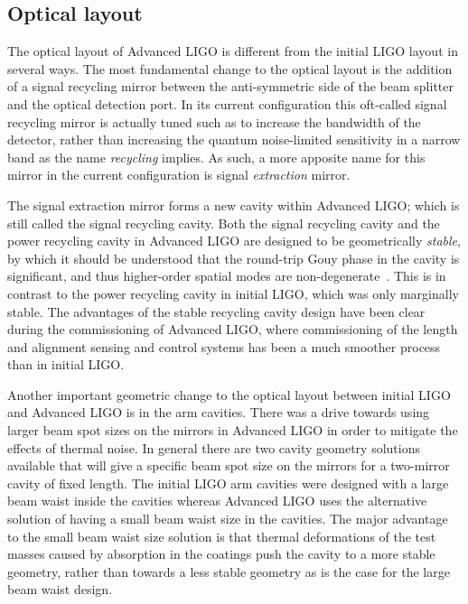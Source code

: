 \subsection{Optical layout}
The optical layout of Advanced LIGO is different from the initial LIGO layout in several ways. 
The most fundamental change to the optical layout is the addition of a signal recycling 
mirror between the anti-symmetric side of the beam splitter and the optical detection port. 
In its current configuration this oft-called signal recycling mirror is actually tuned such as to 
increase the bandwidth of the detector, rather than increasing the quantum noise-limited sensitivity
in a narrow band as the name \textit{recycling} implies. As such, a more apposite name for this mirror 
in the current configuration is signal \textit{extraction} mirror. 

The signal extraction mirror forms a new cavity within Advanced LIGO; which is still called the signal recycling cavity. 
Both the signal recycling cavity and the power recycling cavity in Advanced LIGO are designed to be 
geometrically \emph{stable}, by which it should be understood that the round-trip Gouy phase in the cavity 
is significant, and thus higher-order spatial modes are non-degenerate~\cite{Arain2008}. 
This is in contrast to the power recycling cavity in initial LIGO, which was only marginally stable. 
The advantages of the stable recycling cavity design have been clear during the commissioning of 
Advanced LIGO, where commissioning of the length and alignment sensing and control systems has 
been a much smoother process than in initial LIGO. 

Another important geometric change to the optical layout between initial LIGO and Advanced LIGO is 
in the arm cavities. There was a drive towards using larger beam spot sizes on the mirrors in Advanced 
LIGO in order to mitigate the effects of thermal noise. In general there are two cavity geometry solutions available 
that will give a specific beam spot size on the mirrors for a two-mirror cavity of fixed length. The initial LIGO 
arm cavities were designed with a large beam waist inside the cavities
whereas Advanced LIGO uses the alternative solution of having a small beam waist size in the cavities. 
The major advantage to the small beam waist size solution is that thermal deformations of the test masses caused by 
absorption in the coatings push the cavity to a more stable geometry, rather than towards a less stable geometry as 
is the case for the large beam waist design. 

